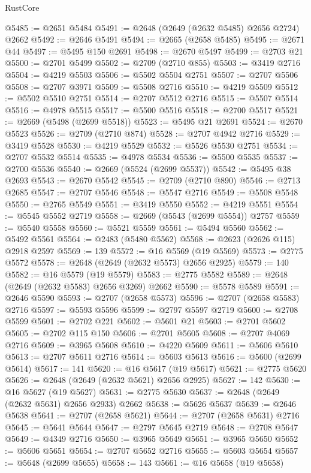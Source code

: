 \begin{lexlean}{RustCore}
\begin{coremodule}
@5485 := @2651 @5484
@5491 := @2648 (@2649 (@2632 @5485) @2656 @2724) @2662
@5492 := @2646 @5491
@5494 := @2665 (@2658 @5485)
@5495 := @2671 @44
@5497 := @5495 @150 @2691
@5498 := @2670 @5497
@5499 := @2703 @21
@5500 := @2701 @5499
@5502 := @2709 (@2710 @855)
@5503 := @3419 @2716
@5504 := @4219 @5503
@5506 := @5502 @5504 @2751
@5507 := @2707 @5506
@5508 := @2707 @3971
@5509 := @5508 @2716
@5510 := @4219 @5509
@5512 := @5502 @5510 @2751
@5514 := @2707 @5512 @2716
@5515 := @5507 @5514
@5516 := @4978 @5515
@5517 := @5500 @5516
@5518 := @2700 @5517
@5521 := @2669 (@5498 (@2699 @5518))
@5523 := @5495 @21 @2691
@5524 := @2670 @5523
@5526 := @2709 (@2710 @874)
@5528 := @2707 @4942 @2716
@5529 := @3419 @5528
@5530 := @4219 @5529
@5532 := @5526 @5530 @2751
@5534 := @2707 @5532 @5514
@5535 := @4978 @5534
@5536 := @5500 @5535
@5537 := @2700 @5536
@5540 := @2669 (@5524 (@2699 @5537))
@5542 := @5495 @38 @2693
@5543 := @2670 @5542
@5545 := @2709 (@2710 @890)
@5546 := @2713 @2685
@5547 := @2707 @5546
@5548 := @5547 @2716
@5549 := @5508 @5548
@5550 := @2765 @5549
@5551 := @3419 @5550
@5552 := @4219 @5551
@5554 := @5545 @5552 @2719
@5558 := @2669 (@5543 (@2699 @5554)) @2757
@5559 := @5540 @5558
@5560 := @5521 @5559
@5561 := @5494 @5560
@5562 := @5492 @5561
@5564 := @2483 (@5480 @5562)
@5568 := @2623 (@2626 @115) @2918 @2597
@5569 := 139
@5572 := @16 @5569 (@19 @5569)
@5573 := @2775 @5572
@5578 := @2648 (@2649 (@2632 @5573) @2656 @2925)
@5579 := 140
@5582 := @16 @5579 (@19 @5579)
@5583 := @2775 @5582
@5589 := @2648 (@2649 (@2632 @5583) @2656 @3269) @2662
@5590 := @5578 @5589
@5591 := @2646 @5590
@5593 := @2707 (@2658 @5573)
@5596 := @2707 (@2658 @5583) @2716
@5597 := @5593 @5596
@5599 := @2797 @5597 @2719
@5600 := @2708 @5599
@5601 := @2702 @221
@5602 := @5601 @21
@5603 := @2701 @5602
@5605 := @2702 @115 @150
@5606 := @2701 @5605
@5608 := @2707 @4069 @2716
@5609 := @3965 @5608
@5610 := @4220 @5609
@5611 := @5606 @5610
@5613 := @2707 @5611 @2716
@5614 := @5603 @5613
@5616 := @5600 (@2699 @5614)
@5617 := 141
@5620 := @16 @5617 (@19 @5617)
@5621 := @2775 @5620
@5626 := @2648 (@2649 (@2632 @5621) @2656 @2925)
@5627 := 142
@5630 := @16 @5627 (@19 @5627)
@5631 := @2775 @5630
@5637 := @2648 (@2649 (@2632 @5631) @2656 @2933) @2662
@5638 := @5626 @5637
@5639 := @2646 @5638
@5641 := @2707 (@2658 @5621)
@5644 := @2707 (@2658 @5631) @2716
@5645 := @5641 @5644
@5647 := @2797 @5645 @2719
@5648 := @2708 @5647
@5649 := @4349 @2716
@5650 := @3965 @5649
@5651 := @3965 @5650
@5652 := @5606 @5651
@5654 := @2707 @5652 @2716
@5655 := @5603 @5654
@5657 := @5648 (@2699 @5655)
@5658 := 143
@5661 := @16 @5658 (@19 @5658)

\end{coremodule}
\end{lexlean}
